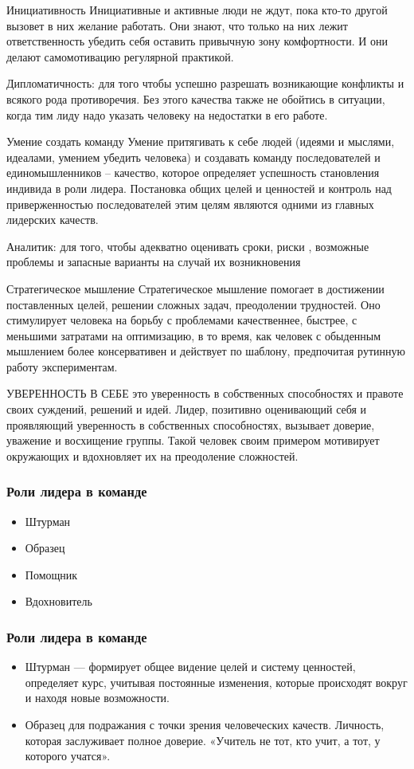 \documentclass{../industrial-development}
\begin{document}
\lecturenotes
Инициативность
Инициативные и активные люди не ждут, пока кто-то другой вызовет в них желание работать. Они знают, что только на них лежит ответственность убедить себя оставить привычную зону комфортности. И они делают самомотивацию регулярной практикой. 

Дипломатичность: для того чтобы успешно разрешать возникающие конфликты и всякого рода противоречия. Без этого качества также не обойтись в ситуации, когда тим лиду надо указать человеку на недостатки в его работе.

Умение создать команду
Умение притягивать к себе людей (идеями и мыслями, идеалами, умением убедить человека) и создавать команду последователей и единомышленников – качество, которое определяет успешность становления индивида в роли лидера. Постановка  общих целей и ценностей и контроль над приверженностью последователей этим целям являются одними из главных лидерских качеств.

Аналитик: для того, чтобы адекватно оценивать сроки, риски , возможные проблемы и запасные варианты на случай их возникновения

Стратегическое мышление
Стратегическое мышление помогает в достижении поставленных целей, решении сложных задач, преодолении трудностей. Оно стимулирует человека на борьбу с проблемами качественнее, быстрее, с меньшими затратами на оптимизацию, в то время, как человек с обыденным мышлением более консервативен и действует по шаблону, предпочитая рутинную работу экспериментам.

УВЕРЕННОСТЬ В СЕБЕ
это уверенность в собственных способностях и правоте своих
суждений, решений и идей. Лидер, позитивно оценивающий себя и проявляющий
уверенность в собственных способностях, вызывает доверие, уважение и восхищение
группы. Такой человек своим примером мотивирует окружающих и вдохновляет их на преодоление сложностей.


\begin{frame} \frametitle{Роли лидера в команде}
  \begin{itemize}
  \item Штурман 
  \item Образец 
  \item Помощник 
  \item Вдохновитель 
  \end{itemize}
\end{frame}

\begin{frame} \frametitle{Роли лидера в команде}
\begin{itemize}
\item Штурман — формирует общее видение целей и систему ценностей, определяет курс, учитывая постоянные изменения, которые происходят вокруг и находя новые возможности.
\item Образец для подражания с точки зрения человеческих качеств. Личность, которая заслуживает полное доверие. «Учитель не тот, кто учит, а тот, у которого учатся».
  \end{itemize}
\end{frame}
\end{document}
